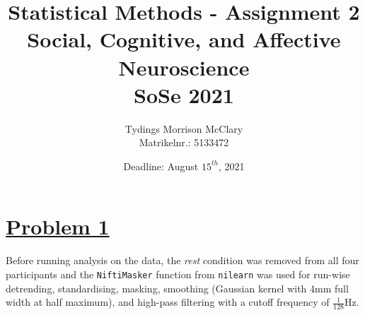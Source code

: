 \documentclass[11pt, a4paper]{article}
\title{%
    \textbf{Statistical Methods - Assignment 2} \\
    \large Social, Cognitive, and Affective Neuroscience\\
    SoSe 2021}
\author{Tydings Morrison McClary \\
    Matrikelnr.: 5133472}
\date{Deadline: August $ 15^{th} $, 2021}
\begin{document}
\null  %
\nointerlineskip  %
\vfill
\let\snewpage \newpage
\let\newpage \relax
\maketitle
\let \newpage \snewpage
\vfill
\thispagestyle{empty}
\break %


\newpage
\section*{\centering \underline{Problem 1}}

Before running analysis on the data, the \emph{rest} condition was removed from all four participants and the \verb|NiftiMasker| function from \verb|nilearn| was used for run-wise detrending, standardising, masking, smoothing (Gaussian kernel with 4mm full width at half maximum), and high-pass filtering with a cutoff frequency of $\frac{1}{128}$Hz.\\
\end{document}
